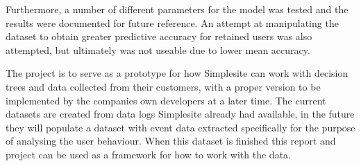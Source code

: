 Furthermore, a number of different parameters for the model was tested and the
results were documented for future reference. An attempt at manipulating the
dataset to obtain greater predictive accuracy for retained users was also
attempted, but ultimately was not useable due to lower mean accuracy.

The project is to serve as a prototype for how Simplesite can work with decision
trees and data collected from their customers, with a proper version to be
implemented by the companies own developers at a later time. The current
datasets are created from data logs Simplesite already had available, in the
future they will populate a dataset with event data extracted specifically for
the purpose of analysing the user behaviour. When this dataset is finished this
report and project can be used as a framework for how to work with the data.
